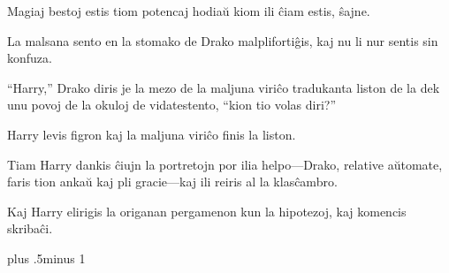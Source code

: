 Magiaj bestoj estis tiom potencaj hodiaŭ kiom ili ĉiam estis, ŝajne.

La malsana sento en la stomako de Drako malplifortiĝis, kaj nu li nur sentis sin konfuza.

``Harry,'' Drako diris je la mezo de la maljuna viriĉo tradukanta liston de la dek unu povoj de la okuloj de vidatestento, ``kion tio volas diri?''

Harry levis figron kaj la maljuna viriĉo finis la liston.

Tiam Harry dankis ĉiujn la portretojn por ilia helpo—Drako, relative aŭtomate, faris tion ankaŭ kaj pli gracie—kaj ili reiris al la klasĉambro.

Kaj Harry elirigis la origanan pergamenon kun la hipotezoj, kaj komencis skribaĉi.

\baselineskip plus .5\textheight minus 1\baselineskip

\savetrivseps
\setlength{\topsep}{0pt}
\setlength{\partopsep}{0pt}

